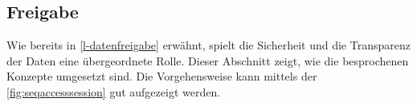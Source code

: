 

\subsection{Freigabe} 


Wie bereits in \autoref{l-datenfreigabe} erwähnt, spielt die Sicherheit und die Transparenz der Daten eine übergeordnete Rolle. Dieser Abschnitt zeigt, wie die besprochenen Konzepte umgesetzt sind. Die Vorgehensweise kann mittels der \autoref{fig:seqaccesssession} gut aufgezeigt werden.


